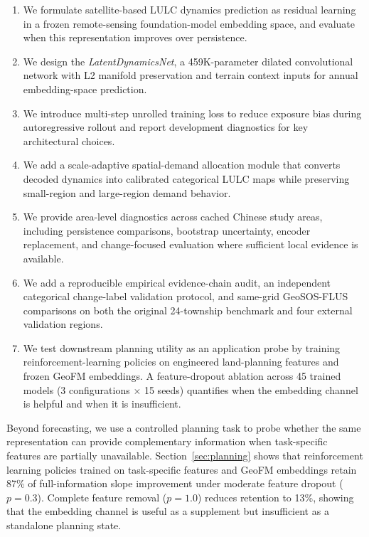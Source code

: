 \documentclass{article}
\begin{document}
\begin{enumerate}
\item We formulate satellite-based LULC dynamics prediction as residual learning in a frozen remote-sensing foundation-model embedding space, and evaluate when this representation improves over persistence.

\item We design the \textit{LatentDynamicsNet}, a 459K-parameter dilated convolutional network with L2 manifold preservation and terrain context inputs for annual embedding-space prediction.

\item We introduce multi-step unrolled training loss to reduce exposure bias during autoregressive rollout and report development diagnostics for key architectural choices.

\item We add a scale-adaptive spatial-demand allocation module that converts decoded dynamics into calibrated categorical LULC maps while preserving small-region and large-region demand behavior.

\item We provide area-level diagnostics across cached Chinese study areas, including persistence comparisons, bootstrap uncertainty, encoder replacement, and change-focused evaluation where sufficient local evidence is available.

\item We add a reproducible empirical evidence-chain audit, an independent categorical change-label validation protocol, and same-grid GeoSOS-FLUS comparisons on both the original 24-township benchmark and four external validation regions.

\item We test downstream planning utility as an application probe by training reinforcement-learning policies on engineered land-planning features and frozen GeoFM embeddings. A feature-dropout ablation across 45 trained models (3 configurations $\times$ 15 seeds) quantifies when the embedding channel is helpful and when it is insufficient.
\end{enumerate}

Beyond forecasting, we use a controlled planning task to probe whether the same representation can provide complementary information when task-specific features are partially unavailable. Section~\ref{sec:planning} shows that reinforcement learning policies trained on task-specific features and GeoFM embeddings retain 87\% of full-information slope improvement under moderate feature dropout ($p=0.3$). Complete feature removal ($p=1.0$) reduces retention to 13\%, showing that the embedding channel is useful as a supplement but insufficient as a standalone planning state.
\end{document}
